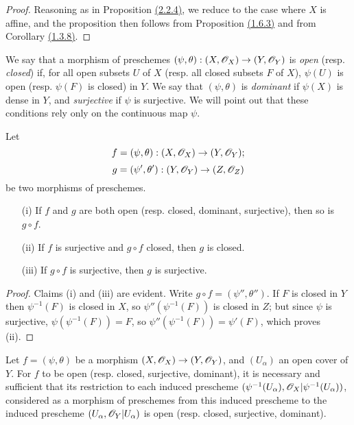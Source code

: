 \begin{proof}
\label{proof-prop-1.2.2.5}
Reasoning as in Proposition \hyperref[prop-1.2.2.4]{(2.2.4)}, we reduce to the case where $X$ is
affine, and the proposition then follows from Proposition \hyperref[prop-1.1.6.3]{(1.6.3)}
and from Corollary \hyperref[cor-1.1.3.8]{(1.3.8)}.
\end{proof}

\begin{env}[2.2.6]
\label{env-1.2.2.6}
We say that a morphism of preschemes
$(\psi,\theta):(X,\mathscr{O}_X)\to(Y,\mathscr{O}_Y)$ is {\em open} (resp. {\em closed})
if, for all open subsets $U$ of $X$ (resp. all closed subsets $F$ of $X$),
$\psi(U)$ is open (resp. $\psi(F)$ is closed) in $Y$. We say that
$(\psi,\theta)$ is {\em dominant} if $\psi(X)$ is dense in $Y$, and
{\em surjective} if $\psi$ is surjective. We will point out that these
conditions rely only on the continuous map $\psi$.
\end{env}

\begin{prop}[2.2.7]
\label{prop-1.2.2.7}
Let
\[
  f=(\psi,\theta):(X,\mathscr{O}_X)\to(Y,\mathscr{O}_Y);
\]
\[
  g=(\psi',\theta'):(Y,\mathscr{O}_Y)\to(Z,\mathscr{O}_Z)
\]
be two morphisms of preschemes.
\begin{itemize}
  \item[{\rm(i)}] If $f$ and $g$ are both open (resp. closed, dominant, surjective),
    then so is $g\circ f$.
  \item[{\rm(ii)}] If $f$ is surjective and $g\circ f$ closed, then $g$ is closed.
  \item[{\rm(iii)}] If $g\circ f$ is surjective, then $g$ is surjective.
\end{itemize}
\end{prop}

\begin{proof}
\label{proof-prop-1.2.2.7}
Claims (i) and (iii) are evident. Write $g\circ f=(\psi'',\theta'')$.
If $F$ is closed in $Y$ then $\psi^{-1}(F)$ is closed in $X$, so
$\psi''(\psi^{-1}(F))$ is closed in $Z$; but since $\psi$ is surjective,
$\psi(\psi^{-1}(F))=F$, so $\psi''(\psi^{-1}(F))=\psi'(F)$, which proves (ii).
\end{proof}

\begin{prop}[2.2.8]
\label{prop-1.2.2.8}
Let $f=(\psi,\theta)$ be a morphism
$(X,\mathscr{O}_X)\to(Y,\mathscr{O}_Y)$, and $(U_\alpha)$ an open cover of $Y$. For $f$ to be
open (resp. closed, surjective, dominant), it is necessary and sufficient that
its restriction to each induced prescheme
$(\psi^{-1}(U_\alpha),\mathscr{O}_X|\psi^{-1}(U_\alpha))$, considered as a morphism of
preschemes from this induced prescheme to the induced prescheme
$(U_\alpha,\mathscr{O}_Y|U_\alpha)$ is open (resp. closed, surjective, dominant).
\end{prop}

